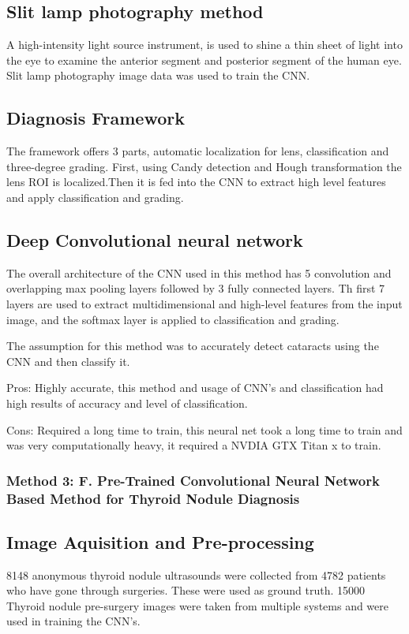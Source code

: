 \documentclass[conference]{IEEEtran}
\begin{document}
\subsection{Slit lamp photography method}
A high-intensity light source instrument, is used to shine a thin sheet of light into the eye to
examine the anterior segment and posterior segment of the human eye.
Slit lamp photography image data was used to train the CNN.

\subsection{Diagnosis Framework}
The framework offers 3 parts, automatic localization for lens, classification and three-degree grading. First, using Candy	detection and Hough transformation the lens ROI is localized.Then it is fed into the CNN to extract high level features and apply classification and grading. 

\subsection{Deep Convolutional neural network}
The overall architecture of the CNN used in this method has 5 convolution and overlapping max pooling layers followed by 3 fully connected layers. Th first 7 layers are used to extract multidimensional and high-level features from the input image, and the softmax layer is applied to classification and grading.

The assumption for this method was to accurately detect cataracts using the CNN and then classify it.

Pros: Highly accurate, this method and usage of CNN's and classification had high results of accuracy and level of classification.

Cons: Required a long time to train, this neural net took a long time to train and was very computationally heavy, it required a NVDIA GTX Titan x to train.\\
\subsubsection{Method 3: F. Pre-Trained Convolutional Neural Network Based Method for Thyroid Nodule Diagnosis}
\subsection{Image Aquisition and Pre-processing}
8148 anonymous thyroid nodule ultrasounds were collected from 4782 patients who have gone through surgeries. These were used as ground truth. 15000 Thyroid nodule pre-surgery images were taken from multiple systems and were used in training the CNN's.\\
\end{document}
